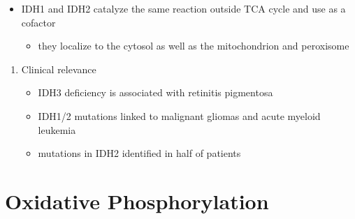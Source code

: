 \documentclass{scrartcl}
\begin{document}

\begin{itemize}
\item IDH1 and IDH2 catalyze the same reaction outside TCA cycle and use
 as a cofactor
\begin{itemize}
\item they localize to the cytosol as well as the mitochondrion and peroxisome
\end{itemize}
\end{itemize}


\begin{enumerate}
\item Clinical relevance
\label{sec:org6cf941d}
\begin{itemize}
\item IDH3 deficiency is associated with retinitis pigmentosa
\item IDH1/2 mutations linked to malignant gliomas and acute myeloid leukemia
\item mutations in IDH2 identified in half of patients
\end{itemize}
\end{enumerate}
\section{Oxidative Phosphorylation}
\label{sec:orgcd8062e}
\end{document}
